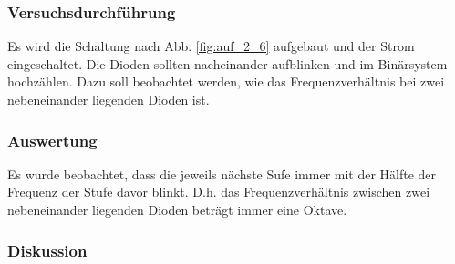 \documentclass[12pt,a4paper]{article}
\begin{document}
\subsubsection*{Versuchsdurchführung}
Es wird die Schaltung nach Abb. \ref{fig:auf_2_6} aufgebaut und der Strom eingeschaltet. Die Dioden sollten nacheinander aufblinken und im Binärsystem hochzählen. Dazu soll beobachtet werden, wie das Frequenzverhältnis bei zwei nebeneinander liegenden Dioden ist.
\subsubsection*{Auswertung}
Es wurde beobachtet, dass die jeweils nächste Sufe immer mit der Hälfte der Frequenz der Stufe davor blinkt. D.h. das Frequenzverhältnis zwischen zwei nebeneinander liegenden Dioden beträgt immer eine Oktave.
\subsubsection*{Diskussion}
\end{document}
